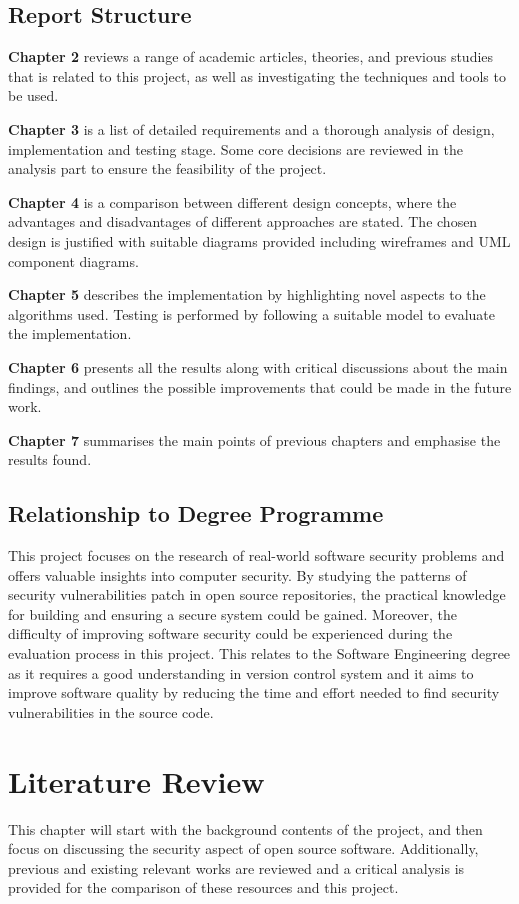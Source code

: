 \documentclass[12pt, a4paper]{report}
\begin{document}
\section{Report Structure}
\textbf{Chapter 2} reviews a range of academic articles, theories, and previous studies that is
related to this project, as well as investigating the techniques and tools to be used.

\noindent\textbf{Chapter 3} is a list of detailed requirements and a thorough analysis of design,
implementation and testing stage. Some core decisions are reviewed in the analysis part to ensure
the feasibility of the project.

\noindent\textbf{Chapter 4} is a comparison between different design concepts, where the advantages
and disadvantages of different approaches are stated. The chosen design is justified with suitable
diagrams provided including wireframes and UML component diagrams.

\noindent\textbf{Chapter 5} describes the implementation by highlighting novel aspects to the
algorithms used. Testing is performed by following a suitable model to evaluate the implementation.

\noindent\textbf{Chapter 6} presents all the results along with critical discussions about the main
findings,	and outlines the possible improvements that could be made in the future work.

\noindent\textbf{Chapter 7} summarises the main points of previous chapters and emphasise the
results found.

\section{Relationship to Degree Programme}
This project focuses on the research of real-world software security problems and offers valuable
insights into computer security. By studying the patterns of security vulnerabilities patch in open
source repositories, the practical knowledge for building and ensuring a secure system could be
gained. Moreover, the difficulty of improving software security could be experienced during the
evaluation process in this project. This relates to the Software Engineering degree as it requires a
good understanding in version control system and it aims to improve software quality by reducing
the time and effort needed to find security vulnerabilities in the source code.

\chapter{Literature Review}
This chapter will start with the background contents of the project, and then focus on discussing
the security aspect of open source software. Additionally, previous and existing relevant works are
reviewed and a critical analysis is provided for the comparison of these resources and this project.
\end{document}
